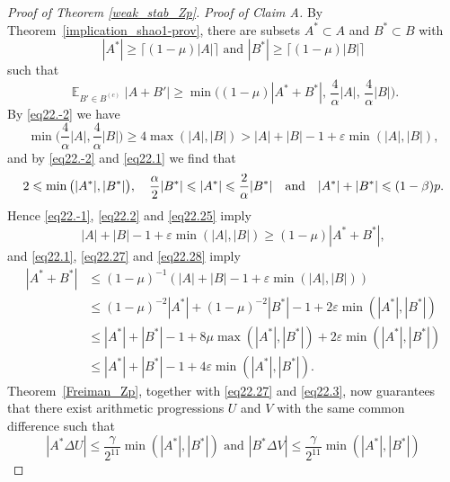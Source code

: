 \documentclass[12pt,reqno]{amsart}
\DeclareMathOperator*{\E}{\mathbb{E}}
\theoremstyle{definition}
\renewcommand\leq{\leqslant}
\renewcommand\geq{\geqslant}
\begin{document}
\begin{proof}[Proof of Theorem \ref{weak_stab_Zp}]
\noindent
{\em Proof of Claim A.}
By Theorem~\ref{implication_shao1-prov}, there are subsets $A^*\subset A$ and $B^*\subset B$ with
\begin{equation}\label{eq22.1}
    |A^*|\geq \lceil (1-\mu)|A|\rceil  \text{ and } |B^*|\geq \lceil (1-\mu)|B|\rceil
\end{equation}
such that
\begin{equation}\label{eq22.2}
    \E_{B'\in B^{(c)}}| A+B'| \geq \min \bigg((1-\mu)|A^*+B^*|\text{, } \frac{4}{\alpha}|A|\text{, } \frac{4}{\alpha}|B|\bigg).
\end{equation}
By \eqref{eq22.-2} we have
\begin{equation}\label{eq22.25}
\min\bigg(\frac{4}{\alpha}|A|,\frac{4}{\alpha}|B|\bigg) \geq 4\max(|A|,|B|) >
    |A|+|B|-1+\varepsilon\min(|A|,|B|),
\end{equation}
and by \eqref{eq22.-2} and \eqref{eq22.1} we find that
\begin{equation}\label{eq22.27}
    2\leq \min\big(|A^*|,|B^*|\big), \ \ \ \frac{\alpha}{2} |B^*| \leq |A^*| \leq \frac{2}{\alpha}|B^*| \ \ \ {\rm and} \ \ \  |A^*|+|B^*| \leq (1-\beta)p.
\end{equation}
Hence \eqref{eq22.-1}, \eqref{eq22.2} and \eqref{eq22.25} imply
\begin{equation}\label{eq22.28}
    |A|+|B|-1+\varepsilon\min(|A|,|B|) \geq (1-\mu)|A^*+B^*|,
\end{equation}
and \eqref{eq22.1}, \eqref{eq22.27} and \eqref{eq22.28} imply
\begin{equation}\label{eq22.3}
    \begin{split}
        |A^*+B^*| &\leq (1-\mu)^{-1}(|A|+|B|-1+\varepsilon\min(|A|,|B|)) \\
        &\leq (1-\mu)^{-2}|A^*|+(1-\mu)^{-2}|B^*|-1+2\varepsilon \min(|A^*|, |B^*|)\\
        &\leq |A^*|+|B^*|-1+8\mu\max(|A^*|,|B^*|)+ 2\varepsilon\min(|A^*|,|B^*|)\\
        &\leq |A^*|+|B^*|-1+4\varepsilon\min(|A^*|,|B^*|).
        \end{split}
\end{equation}
Theorem~\ref{Freiman_Zp}, together with \eqref{eq22.27} and \eqref{eq22.3}, now guarantees that there exist arithmetic progressions $U$ and $V$ with the same common difference such that
\begin{equation}\label{eq22.4}
    |A^*\Delta U| \leq \frac{\gamma}{2^{11}}\min(|A^*|,|B^*|) \text{ and } |B^*\Delta V| \leq \frac{\gamma}{2^{11}}\min(|A^*|,|B^*|)
\end{equation}

\end{proof}
\end{document}
